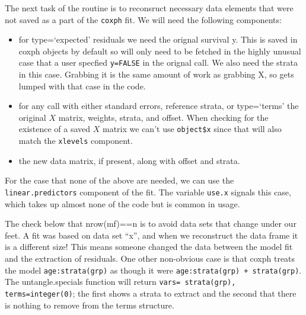 \documentclass{article}
\newcommand{\code}[1]{\texttt{#1}}
\begin{document}
The next task of the routine is to reconsruct necessary data elements
that were not saved as a part of the \code{coxph} fit.  
We will need the following components: 
\begin{itemize}
  \item for type=`expected' residuals we need the orignal survival y.  This %
    is saved in coxph objects by default so will only need to be fetched in
    the highly unusual case that a user specfied \code{y=FALSE} in the orignal 
    call.  We also need the strata in this case.  Grabbing it is the same
    amount of work as grabbing X, so gets lumped with that case in the
    code.
  \item for any call with either standard errors,  reference strata, 
    or type=`terms'
     the original $X$ matrix, weights, strata, and offset. 
     When checking for the existence of a saved $X$ matrix we can't        %
     use \code{object\$x}
     since that will also match the \code{xlevels} component.
  \item the new data matrix, if present, along with offset and strata.
\end{itemize}
For the case that none of the above are needed, we can use the 
\code{linear.predictors} component of the fit.  The variable \code{use.x} signals
this case, which takes up almost none of the code but is common in usage.

The check below that nrow(mf)==n is to avoid data sets that change under our
feet.  A fit was based on data set ``x'', and when we reconstruct the data
frame it is a different size!  This means someone changed the data between
the model fit and the extraction of residuals.  
One other non-obvious case is that coxph treats the model \code{age:strata(grp)}
as though it were \code{age:strata(grp) + strata(grp)}.  
The untangle.specials function will return 
\code{vars= strata(grp),  terms=integer(0)}; the first shows a strata to extract
and the second that there is nothing to remove from the terms structure.
\end{document}
